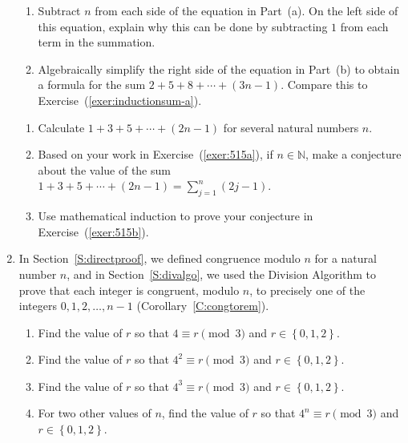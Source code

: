 \begin{enumerate}
\begin{enumerate}
\item Subtract $n$ from each side of the equation in Part~(a).  On the left side of this equation, explain why this can be done by subtracting $1$ from each term in the summation. \label{exer:previnduction-b}

\item Algebraically simplify the right side of the equation in Part~(b) to obtain a formula for the sum $2 + 5 + 8 + \cdots + \left( 3n - 1 \right)$.  Compare this to 
Exercise~(\ref{exer:inductionsum-a}).
\end{enumerate}

\xitem \label{exer:sec51-5} \begin{enumerate} \item Calculate  
$1 + 3 + 5 +  \cdots  + \left( {2n - 1} \right)$
for several natural numbers  $n$. \label{exer:515a}

\item Based on your work in Exercise~(\ref{exer:515a}), if  $n \in \mathbb{N}$, make a conjecture about the value of  the sum $1 + 3 + 5 +  \cdots  + \left( {2n - 1} \right) = \sum\limits_{j = 1}^n {\left( {2j - 1} \right)} $.  \label{exer:515b}

\item Use mathematical induction to prove your conjecture in Exercise~(\ref{exer:515b}).
\end{enumerate}

\item In Section~\ref{S:directproof}, we defined congruence modulo  $n$  for a natural number 
$n$, and in Section~\ref{S:divalgo}, we used the Division Algorithm to prove that each integer is congruent, modulo  $n$, to precisely one of the integers  $0,1,2, \ldots ,n - 1$ (Corollary~\ref{C:congtorem}). \label{exer:mod3conjecture}

\begin{enumerate}
\item Find the value of  $r$  so that   $4 \equiv r \pmod 3$ and  $r \in \left\{ {0,1,2} \right\}$.

\item Find the value of  $r$  so that   $4^2  \equiv r \pmod 3$ and  $r \in \left\{ {0,1,2} \right\}$.

\item Find the value of  $r$  so that   $4^3  \equiv r \pmod 3$  and  $r \in \left\{ {0,1,2} \right\}$.

\item For two other values of $n$, find the value of  $r$  so that   $4^n  \equiv r \pmod 3$  and  $r \in \left\{ {0,1,2} \right\}$.


\end{enumerate}
\end{enumerate}
